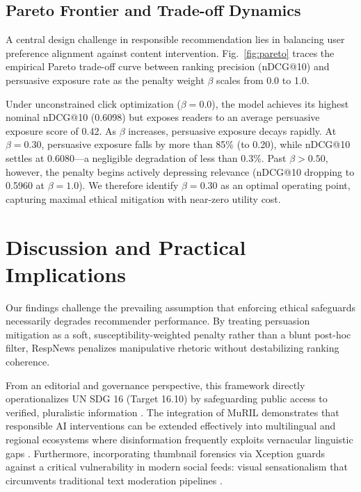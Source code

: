 \documentclass[conference]{IEEEtran}
\begin{document}
\subsection{Pareto Frontier and Trade-off Dynamics}
A central design challenge in responsible recommendation lies in balancing user preference alignment against content intervention. Fig.~\ref{fig:pareto} traces the empirical Pareto trade-off curve between ranking precision (nDCG@10) and persuasive exposure rate as the penalty weight $\beta$ scales from 0.0 to 1.0. 

Under unconstrained click optimization ($\beta=0.0$), the model achieves its highest nominal nDCG@10 (0.6098) but exposes readers to an average persuasive exposure score of 0.42. As $\beta$ increases, persuasive exposure decays rapidly. At $\beta=0.30$, persuasive exposure falls by more than 85\% (to 0.20), while nDCG@10 settles at 0.6080—a negligible degradation of less than 0.3\%. Past $\beta > 0.50$, however, the penalty begins actively depressing relevance (nDCG@10 dropping to 0.5960 at $\beta=1.0$). We therefore identify $\beta=0.30$ as an optimal operating point, capturing maximal ethical mitigation with near-zero utility cost.

\section{Discussion and Practical Implications}
Our findings challenge the prevailing assumption that enforcing ethical safeguards necessarily degrades recommender performance. By treating persuasion mitigation as a soft, susceptibility-weighted penalty rather than a blunt post-hoc filter, RespNews penalizes manipulative rhetoric without destabilizing ranking coherence. 

From an editorial and governance perspective, this framework directly operationalizes UN SDG 16 (Target 16.10) by safeguarding public access to verified, pluralistic information \cite{sdg}. The integration of MuRIL demonstrates that responsible AI interventions can be extended effectively into multilingual and regional ecosystems where disinformation frequently exploits vernacular linguistic gaps \cite{khanuja_muril}. Furthermore, incorporating thumbnail forensics via Xception guards against a critical vulnerability in modern social feeds: visual sensationalism that circumvents traditional text moderation pipelines \cite{dimitrov_semeval2021}.
\end{document}
